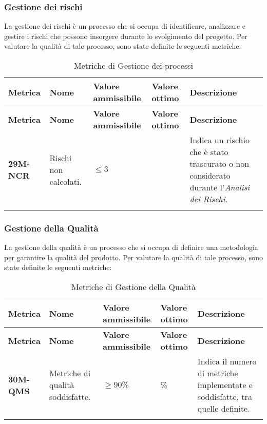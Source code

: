 \subsubsection{Gestione dei rischi}
La gestione dei rischi è un processo che si occupa di identificare, analizzare e gestire i rischi che possono insorgere durante lo svolgimento del progetto. Per valutare la qualità di tale processo, sono state definite le seguenti metriche:
\begin{longtable}{|>{\raggedright\arraybackslash}m{}|>{\raggedright\arraybackslash}m{}|>{\raggedright\arraybackslash}m{}|>{\raggedright\arraybackslash}m{}|>{\raggedright\arraybackslash}m{}|}
	\hline
	\textbf{Metrica} & \textbf{Nome} & \textbf{Valore ammissibile} & \textbf{Valore ottimo} & \textbf{Descrizione}\\
	\hline
	\endfirsthead
	\hline
	\textbf{Metrica} & \textbf{Nome} & \textbf{Valore ammissibile} & \textbf{Valore ottimo} & \textbf{Descrizione}\\
	\endhead
	\textbf{29M-NCR} & Rischi non calcolati. & $\leq 3 $ & 0 & Indica un rischio che è stato trascurato o non considerato durante l’\textit{Analisi dei Rischi}. \\
	\hline
	\hline
	\caption{Metriche di Gestione dei processi}
	\label{table:9}
\end{longtable}

\subsubsection{Gestione della Qualità}
La gestione della qualità è un processo che si occupa di definire una metodologia per garantire la qualità del prodotto. Per valutare la qualità di tale processo, sono state definite le seguenti metriche:
\begin{longtable}{|>{\raggedright\arraybackslash}m{}|>{\raggedright\arraybackslash}m{}|>{\raggedright\arraybackslash}m{}|>{\raggedright\arraybackslash}m{}|>{\raggedright\arraybackslash}m{}|}
	\hline
	\textbf{Metrica} & \textbf{Nome} & \textbf{Valore ammissibile} & \textbf{Valore ottimo} & \textbf{Descrizione} \\
	\hline
	\endfirsthead
	\hline
	\textbf{Metrica} & \textbf{Nome} & \textbf{Valore ammissibile} & \textbf{Valore ottimo} & \textbf{Descrizione}\\
	\endhead
	\textbf{30M-QMS} & Metriche di qualità soddisfatte. & $\geq 90\% $ & 100\% & Indica il numero di metriche implementate e soddisfatte, tra quelle definite. \\
	\hline
	\caption{Metriche di Gestione della Qualità}
	\label{table:10}
\end{longtable}

